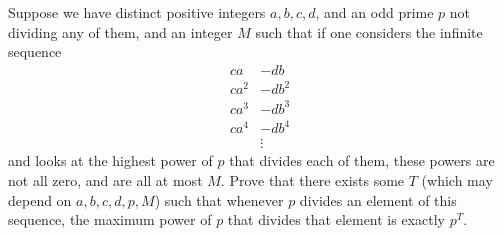 Suppose we have distinct positive integers $a, b, c, d$, and an odd prime $p$ not dividing any of them, and an integer $M$ such that if one considers the infinite sequence
\begin{align*}
	ca &- db \\
	ca^2 &- db^2 \\
	ca^3 &- db^3 \\
	ca^4 &- db^4 \\
	&\vdots
\end{align*}
and looks at the highest power of $p$ that divides each of them, these powers are not all zero, and are all at most $M$. Prove that there exists some $T$ (which may depend on $a,b,c,d,p,M$) such that whenever $p$ divides an element of this sequence, the maximum power of $p$ that divides that element is exactly $p^T$.